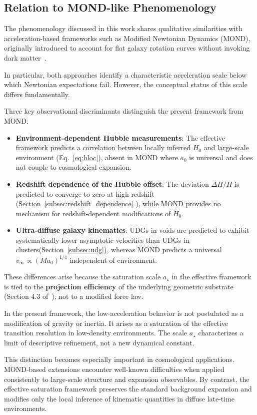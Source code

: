 \subsection{Relation to MOND-like Phenomenology}
  \label{subsec:mond_relation}

  The phenomenology discussed in this work shares qualitative similarities with
  acceleration-based frameworks such as Modified Newtonian Dynamics (MOND),
  originally introduced to account for flat galaxy rotation curves without
  invoking dark matter~\cite{Milgrom1983,Famaey2012Review}.

  In particular, both approaches identify a characteristic acceleration scale
  below which Newtonian expectations fail.
  However, the conceptual status of this scale differs fundamentally.

  Three key observational discriminants distinguish the present framework from MOND:
  \begin{itemize}
    \item \textbf{Environment-dependent Hubble measurements}: The effective framework predicts a correlation between
    locally inferred \(H_0\) and large-scale environment (Eq.~\eqref{eq:hloc}), absent in MOND where \(a_0\)
    is universal and does not couple to cosmological expansion.

    \item \textbf{Redshift dependence of the Hubble offset}: The deviation \(\Delta H/H\)
    is predicted to converge to zero at high redshift (Section~\ref{subsec:redshift_dependence}
    ), while MOND provides no mechanism for redshift-dependent modifications of \(H_0\).

    \item \textbf{Ultra-diffuse galaxy kinematics}: UDGs in voids are predicted to exhibit systematically lower
    asymptotic velocities than UDGs in clusters(Section~\ref{subsec:udg}), whereas MOND predicts a universal
    \(v_{\infty} \propto (M a_0)^{1/4}\) independent of environment.
  \end{itemize}
  These differences arise because the saturation scale \(a_\star\) in the effective framework is tied to the
  \textbf{projection efficiency}
  of the underlying geometric substrate (Section 4.3 of~\cite{Beau2026c}), not to a modified force law.

  In the present framework, the low-acceleration behavior is not postulated as a modification of gravity or inertia.
  It arises as a saturation of the effective transition resolution in low-density environments.
  The scale $a_\star$ characterizes a limit of descriptive refinement, not a new dynamical constant.

  This distinction becomes especially important in cosmological applications.
  MOND-based extensions encounter well-known difficulties when applied consistently to large-scale structure
  and expansion observables.
  By contrast, the effective saturation framework preserves the standard background expansion
  and modifies only the local inference of kinematic quantities in diffuse late-time environments.
